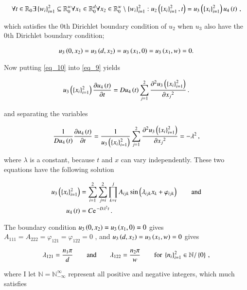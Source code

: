 \documentclass[11pt,english,a4paper]{article}
\begin{document}
\begin{flushleft}
\begin{align}
\forall t\in \mathbb{R}_0\exists\left\lbrace{w_i}\right\rbrace_{i=1}^2\subseteq \mathbb{R}_0^w \forall x_1\in \mathbb{R}_{0}^d \forall x_2\in\mathbb{R}_0^w \setminus \left\lbrace{w_i}\right\rbrace_{i=1}^2 : u_2\left({\left\lbrace{x_i}\right\rbrace_{i=1}^2,t}\right) = u_3\left({\left\lbrace{x_i}\right\rbrace_{i=1}^2}\right)u_4\left({t}\right) \,,
\label{eq_10}
\end{align}

which satisfies the 0th Dirichlet boundary condition of $u_2$ when $u_3$ also have the 0th Dirichlet boundary condition;

\begin{align*}
u_3\left({0,x_2}\right)=u_3\left({d,x_2}\right)=u_3\left({x_1,0}\right)=u_3\left({x_1,w}\right)=0.
\end{align*}

Now putting \eqref{eq_10} into \eqref{eq_9} yields

\begin{align*}
u_3\left({\left\lbrace{x_i}\right\rbrace_{i=1}^2}\right)\frac{\partial u_4\left({t}\right)}{\partial t} = Du_4\left({t}\right)\sum_{j=1}^2\frac{\partial^2 u_3\left({\left\lbrace{x_i}\right\rbrace_{i=1}^2}\right)}{\partial {x_j}^2} \,.
\end{align*}

and separating the variables

\begin{align*}
\frac{1}{Du_4\left({t}\right)} \frac{\partial u_4\left({t}\right)}{\partial t} = \frac{1}{u_3\left({\left\lbrace{x_i}\right\rbrace_{i=1}^2}\right)}\sum_{j=1}^2\frac{\partial^2 u_3\left({\left\lbrace{x_i}\right\rbrace_{i=1}^2}\right)}{\partial {x_j}^2} = -\lambda^2 \,,
\end{align*}

where $\lambda$ is a constant, because $t$ and $x$ can vary independently. These two equations have the following solution

\begin{align*}
u_3\p{\kr{x_i}_{i=1}^2} &= \sum_{i=1}^2\sum_{j=i}^2 \prod_{k=i}^j A_{ijk} \sin\p{\lambda_{ijk} x_k + \varphi_{ijk}} \qquad \text{and}
\\
u_4\p{t} &= C\e^{-D\lambda^2 t}\,.
\end{align*}

The boundary condition $u_3\left({0,x_2}\right)=u_3\left({x_1,0}\right)=0$ gives $A_{111} = A_{222} = \varphi_{121}=\varphi_{122}=0$ , and $u_3\left({d,x_2}\right)=u_3\left({x_1,w}\right)=0$ gives 

\begin{align*}
\lambda_{121} = \frac{n_1\pi}{d}  \qquad \text{and} \qquad \lambda_{122} = \frac{n_2\pi}{w} \qquad \text{for } \left\lbrace{n_i}\right\rbrace_{i=1}^2 \in \mathbb{N}/\left\lbrace{0}\right\rbrace\,,
\end{align*}

where I let $\mathbb{N}=\mathbb{N}_{-\infty}^{\infty}$ represent all positive and negative integers, which much satisfies


\end{flushleft}
\end{document}

